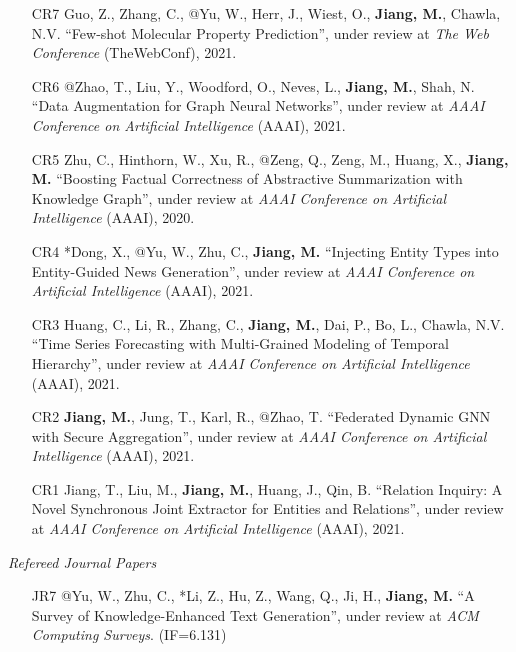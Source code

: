 \documentclass[10pt]{article}
\newenvironment{myindentpar}[1]%
{\begin{list}{}%
         {\setlength{\leftmargin}{#1}}%
         \item[]%
}
{\end{list}}
\newcounter{list}
\begin{document}
\begin{myindentpar}{0.00cm}
\begin{enumerate}[leftmargin=.5cm]
\item[CR7] Guo, Z., Zhang, C., @Yu, W., Herr, J., Wiest, O., \textbf{Jiang, M.}, Chawla, N.V. ``Few-shot Molecular Property Prediction'', under review at \textit{The Web Conference} (TheWebConf), 2021.
	
\item[CR6] @Zhao, T., Liu, Y., Woodford, O., Neves, L., \textbf{Jiang, M.}, Shah, N. ``Data Augmentation for Graph Neural Networks'', under review at \textit{AAAI Conference on Artificial Intelligence} (AAAI), 2021.
	
\item[CR5] Zhu, C., Hinthorn, W., Xu, R., @Zeng, Q., Zeng, M., Huang, X., \textbf{Jiang, M.} ``Boosting Factual Correctness of Abstractive Summarization with Knowledge Graph'', under review at \textit{AAAI Conference on Artificial Intelligence} (AAAI), 2020.
		
\item[CR4] *Dong, X., @Yu, W., Zhu, C., \textbf{Jiang, M.} ``Injecting Entity Types into Entity-Guided News Generation'', under review at \textit{AAAI Conference on Artificial Intelligence} (AAAI), 2021.

\item[CR3] Huang, C., Li, R., Zhang, C., \textbf{Jiang, M.}, Dai, P., Bo, L., Chawla, N.V. ``Time Series Forecasting with Multi-Grained Modeling of Temporal Hierarchy'', under review at \textit{AAAI Conference on Artificial Intelligence} (AAAI), 2021.

\item[CR2] \textbf{Jiang, M.}, Jung, T., Karl, R., @Zhao, T. ``Federated Dynamic GNN with Secure Aggregation'', under review at \textit{AAAI Conference on Artificial Intelligence} (AAAI), 2021.

\item[CR1] Jiang, T., Liu, M., \textbf{Jiang, M.}, Huang, J., Qin, B. ``Relation Inquiry: A Novel Synchronous Joint Extractor for Entities and Relations'', under review at \textit{AAAI Conference on Artificial Intelligence} (AAAI), 2021.

\end{enumerate}

\vspace{.2cm}\hspace{-0.25cm}\textit{Refereed Journal Papers}

\begin{enumerate}[leftmargin=.5cm]

\item[JR7] @Yu, W., Zhu, C., *Li, Z., Hu, Z., Wang, Q., Ji, H., \textbf{Jiang, M.} ``A Survey of Knowledge-Enhanced Text Generation'', under review at \textit{ACM Computing Surveys}. (IF=6.131)


\end{enumerate}
\end{myindentpar}
\end{document}

